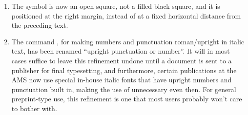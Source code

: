 \documentclass{amsdtx}
\begin{document}
\begin{enumerate}
\item The  symbol is now an open square, not a filled black
square, and it is positioned at the right margin, instead of at a fixed
horizontal distance from the preceding text.

\item The command , for making numbers and punctuation
roman/upright in italic text, has been renamed  ``upright
punctuation or number''. It will in most cases suffice to leave this
refinement undone until a document is sent to a publisher for final
typesetting, and furthermore, certain publications at the AMS now use
special in-house italic fonts that have upright numbers and punctuation
built in, making the use of  unnecessary even then. For general
preprint-type use, this refinement is one that most users probably won't
care to bother with.

\end{enumerate}
\end{document}
